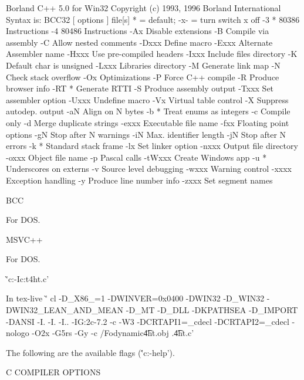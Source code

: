 {\Verbatim
Borland C++ 5.0 for Win32 Copyright (c) 1993, 1996 Borland International
Syntax is: BCC32 [ options ] file[s]     * = default; -x- = turn switch x off
  -3    * 80386 Instructions        -4      80486 Instructions
  -Ax     Disable extensions        -B      Compile via assembly
  -C      Allow nested comments     -Dxxx   Define macro
  -Exxx   Alternate Assembler name  -Hxxx   Use pre-compiled headers
  -Ixxx   Include files directory   -K      Default char is unsigned
  -Lxxx   Libraries directory       -M      Generate link map
  -N      Check stack overflow      -Ox     Optimizations
  -P      Force C++ compile         -R      Produce browser info
  -RT   * Generate RTTI             -S      Produce assembly output
  -Txxx   Set assembler option      -Uxxx   Undefine macro
  -Vx     Virtual table control     -X      Suppress autodep. output
  -aN     Align on N bytes          -b    * Treat enums as integers
  -c      Compile only              -d      Merge duplicate strings
  -exxx   Executable file name      -fxx    Floating point options
  -gN     Stop after N warnings     -iN     Max. identifier length
  -jN     Stop after N errors       -k    * Standard stack frame
  -lx     Set linker option         -nxxx   Output file directory
  -oxxx   Object file name          -p      Pascal calls
  -tWxxx  Create Windows app        -u    * Underscores on externs
  -v      Source level debugging    -wxxx   Warning control
  -xxxx   Exception handling        -y      Produce line number info
  -zxxx   Set segment names
\EndVerbatim


\item {BCC}

For DOS.

\item {MSVC++}

For DOS.

\`'c:\msvc\bin\cl  -Ic:\msvc  t4ht.c'

In tex-live \`' cl  -D_X86_=1 -DWINVER=0x0400 -DWIN32 -D_WIN32 
-DWIN32_LEAN_AND_MEAN -D_MT -D_DLL  -DKPATHSEA 
-D_IMPORT -DANSI -I. -I.   -I.. -IG:\fptex\source\web2c-7.2  -c -W3 
-DCRTAPI1=_cdecl -DCRTAPI2=_cdecl -nologo  -O2x -G5rs -Gy  
-c /Fodynamic\t4ht.obj .\t4ht.c'

The following are the available flags (\''c:\msvc\bin\cl -help').

\Verbatim
                         C COMPILER OPTIONS

}
